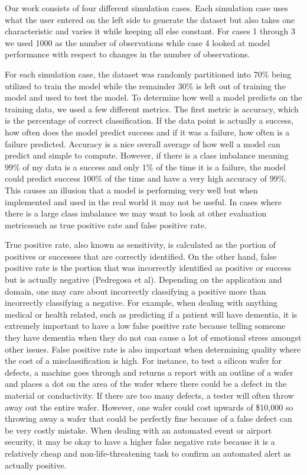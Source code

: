 \documentclass{llncs}
\begin{document}
\noindent 
Our work consists of four different simulation cases.  Each simulation case uses what the user entered on the left side to generate the dataset but also takes one characteristic and varies it while keeping all else constant. For cases 1 through 3 we used 1000 as the number of observations while case 4 looked at model performance with respect to changes in the number of observations. 

\noindent 
For each simulation case, the dataset was randomly partitioned into 70\% being utilized to train the model while the remainder 30\% is left out of training the model and used to test the model. To determine how well a model predicts on the training data, we used a few different metrics. The first metric is accuracy, which is the percentage of correct classification. If the data point is actually a success, how often does the model predict success and if it was a failure, how often is a failure predicted. Accuracy is a nice overall average of how well a model can predict and simple to compute.  However, if there is a class imbalance meaning 99\% of my data is a success and only 1\% of the time it is a failure, the model could predict success 100\% of the time and have a very high accuracy of 99\%.  This causes an illusion that a model is performing very well but when implemented and used in the real world it may not be useful. In cases where there is a large class imbalance we may want to look at other evaluation metricssuch as true positive rate and false positive rate.  


\noindent 
True positive rate, also known as sensitivity, is calculated as the portion of positives or successes that are correctly identified. On the other hand, false positive rate is the portion that was incorrectly identified as positive or success but is actually negative (Pedregosa et al). Depending on the application and domain, one may care about incorrectly classifying a positive more than incorrectly classifying a negative.  For example, when dealing with anything medical or health related, such as predicting if a patient will have dementia, it is extremely important to have a low false positive rate because telling someone they have dementia when they do not can cause a lot of emotional stress amongst other issues.  False positive rate is also important when determining quality where the cost of a misclassification is high.  For instance, to test a silicon wafer for defects, a machine goes through and returns a report with an outline of a wafer and places a dot on the area of the wafer where there could be a defect in the material or conductivity.  If there are too many defects, a tester will often throw away out the entire wafer.  However, one wafer could cost upwards of \$10,000 so throwing away a wafer that could be perfectly fine because of a false defect can be very costly mistake.  When dealing with an automated event or airport security, it may be okay to have a higher false negative rate because it is a relatively cheap and non-life-threatening task to confirm an automated alert as actually positive.
\end{document}
